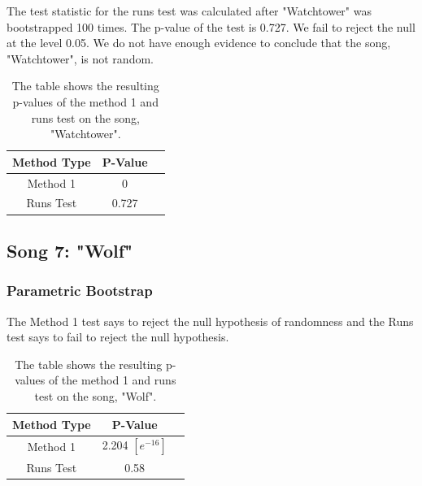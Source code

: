 \documentclass[12pt, letterpaper]{article}
\begin{document}
The test statistic for the runs test was calculated after "Watchtower" was bootstrapped 100 times. The p-value of the test is 0.727. We fail to reject the null at the level 0.05. We do not have enough evidence to conclude that the song, "Watchtower", is not random.
\begin{table}[h]
\begin{center}
\begin{tabular}{|c|c|c|}
\hline
\textbf{Method Type} & P-Value \\
\hline
Method 1 & 0  \\
\hline
Runs Test & 0.727 \\ 
\hline
\end{tabular}
\end{center}
\caption{The table shows the resulting p-values of the method 1 and runs test on the song, "Watchtower".}
\label{fig: P-values for "Watchtower": Nonparametric Bootstrap}
\end{table}

\subsection{Song 7: "Wolf"}
\subsubsection{Parametric Bootstrap}
The Method 1 test says to reject the null hypothesis of randomness and the Runs test says to fail to reject the null hypothesis.
\begin{table}[!h]
\begin{center}
\begin{tabular}{|c|c|c|}
\hline
\textbf{Method Type} & P-Value  \\
\hline
Method 1 & 2.204 $[e^{-16}]$ \\
\hline
Runs Test & 0.58 \\ 
\hline
\end{tabular}
\end{center}
\caption{The table shows the resulting p-values of the method 1 and runs test on the song, "Wolf".}
\label{fig: P-values for "Wolf": Parametric Bootstrap}
\end{table}
\end{document}
